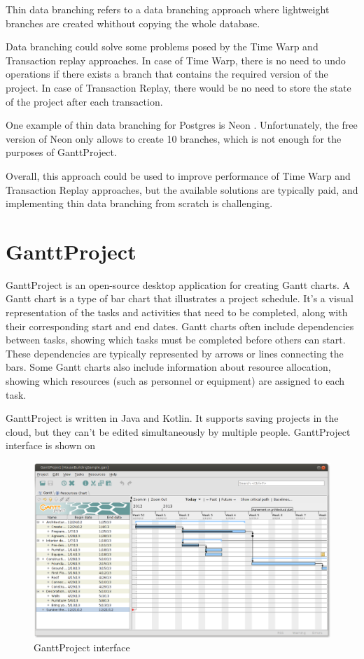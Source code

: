 \documentclass[a4paper, 11pt, oneside]{article}
\theoremstyle{definition}
\begin{document}
Thin data branching refers to a data branching approach where lightweight branches are created whithout copying the whole database.

Data branching could solve some problems posed by the Time Warp and Transaction replay approaches. In case of Time Warp, there is no need to undo operations if there exists a branch that contains the required version of the project. In case of Transaction Replay, there would be no need to store the state of the project after each transaction. 

One example of thin data branching for Postgres is Neon \cite{neon}. Unfortunately, the free version of Neon only allows to create 10 branches, which is not enough for the purposes of GanttProject.

Overall, this approach could be used to improve performance of Time Warp and Transaction Replay approaches, but the available solutions are typically paid, and implementing thin data branching from scratch is challenging.

\section{GanttProject}

GanttProject is an open-source desktop application for creating Gantt charts. A Gantt chart is a type of bar chart that illustrates a project schedule. It's a visual representation of the tasks and activities that need to be completed, along with their corresponding start and end dates. Gantt charts often include dependencies between tasks, showing which tasks must be completed before others can start. These dependencies are typically represented by arrows or lines connecting the bars. Some Gantt charts also include information about resource allocation, showing which resources (such as personnel or equipment) are assigned to each task.

GanttProject is written in Java and Kotlin. It supports saving projects in the cloud, but they can't be edited simultaneously by multiple people. GanttProject interface is shown on  

\begin{figure}
    \includegraphics[width=\linewidth]{img/ganttproject.png}
    \caption{GanttProject interface}
    \label{fig:ganttscreen}
\end{figure}
\end{document}
